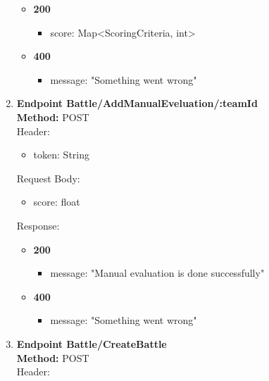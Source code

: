 \begin{enumerate}
    \begin{itemize}
        \item \textbf{200} \\
        \begin{itemize}
            \item score: Map<ScoringCriteria, int>
        \end{itemize}
        \item \textbf{400} \\
        \begin{itemize}
            \item message: "Something went wrong"
        \end{itemize}
    \end{itemize}
    \item \textbf{Endpoint Battle/AddManualEveluation/:teamId} \\
    \textbf{Method:} POST \\
    Header:\\
    \begin{itemize}
        \item token: String
    \end{itemize}
    Request Body:\\
    \begin{itemize}
        \item score: float
    \end{itemize}
    Response:\\
    \begin{itemize}
        \item \textbf{200} \\
        \begin{itemize}
            \item message: "Manual evaluation is done successfully"
        \end{itemize}
        \item \textbf{400} \\
        \begin{itemize}
            \item message: "Something went wrong"
        \end{itemize}
    \end{itemize}
     \item \textbf{Endpoint Battle/CreateBattle} \\
    \textbf{Method:} POST \\
    Header:\\
    \begin{itemize}

\end{itemize}
\end{enumerate}
